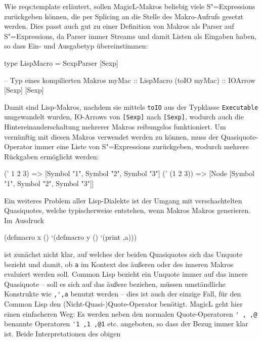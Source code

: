 \documentclass[11pt, a4paper, bibgerm]{scrbook}
\newenvironment{DIFnomarkup}{}{}
\newcommand\icode[1]{\lstinline?#1?}
\newcommand\sref{}
\newcommand{\sexps}{S"=Expressions}
\begin{document}
Wie \sref{reqs:template} erläutert, sollen MagicL-Makros beliebig viele
\sexps{} zurückgeben können, die per Splicing an die Stelle des
Makro-Aufrufs gesetzt werden. Dies passt auch gut zu einer Definition
von Makros als Parser auf \sexps{}, da Parser immer Streams und damit
Listen als Eingaben haben, so dass Ein- und Ausgabetyp übereinstimmen:
\begin{DIFnomarkup}\begin{code}
type LispMacro = SexpParser [Sexp]

-- Typ eines kompilierten Makros
myMac        :: LispMacro
(toIO myMac) :: IOArrow [Sexp] [Sexp]
\end{code}\end{DIFnomarkup}
Damit sind Lisp-Makros, nachdem sie mittels \icode{toIO} aus der Typklasse
\icode{Executable} umgewandelt wurden, IO-Arrows von \icode{[Sexp]} nach
\icode{[Sexp]}, wodurch auch die Hintereinanderschaltung mehrerer
Makros reibungslos funktioniert. Um vernünftig mit diesen Makros
verwendet werden zu können, muss der Quasiquote-Operator immer eine
Liste von \sexps{} zurückgeben, wodurch mehrere Rückgaben ermöglicht
werden:
\begin{DIFnomarkup}\begin{code}
(' 1 2 3)     =>   [Symbol "1", Symbol "2", Symbol "3"]
(' (1 2 3))   =>   [Node [Symbol "1", Symbol "2", Symbol "3"]]
\end{code}\end{DIFnomarkup}
Ein weiteres Problem aller Lisp-Dialekte ist der Umgang mit
verschachtelten Quasiquotes, welche typischerweise entstehen, wenn
Makros Makros generieren. Im Ausdruck
\begin{DIFnomarkup}\begin{code}
(defmacro x ()
  `(defmacro y ()
     `(print ,a)))
\end{code}\end{DIFnomarkup}
ist zunächst nicht klar, auf welches der beiden Quasiquotes sich das Unquote
bezieht und damit, ob \icode{a} im Kontext des äußeren oder des inneren
Makros evaluiert werden soll. Common Lisp bezieht ein Unquote immer auf
das innere Quasiquote -- soll es sich auf das äußere beziehen, müssen
umständliche Konstrukte wie \icode{,',a} benutzt werden -- dies ist auch
der einzige Fall, für den Common Lisp den (Nicht-Quasi-)Quote-Operator
benötigt. MagicL geht hier einen einfacheren Weg: Es werden neben den
normalen Quote-Operatoren \icode{' , ,@} benannte
Operatoren \icode{'1 ,1 ,@1} etc. angeboten,
so dass der Bezug immer klar ist. Beide Interpretationen des obigen
\end{document}
